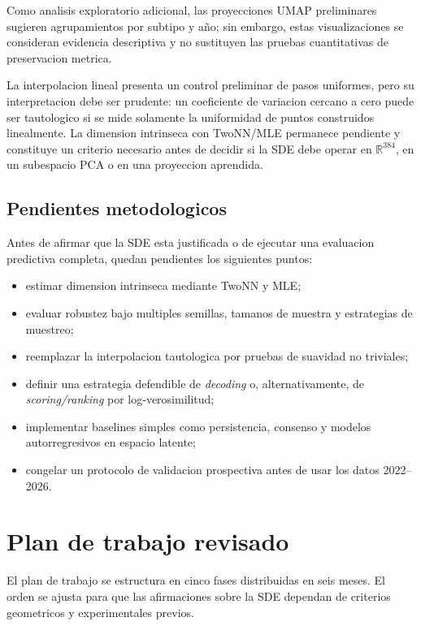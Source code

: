 \documentclass[12pt,letterpaper]{article}
\newcommand{\R}{\mathbb{R}}
\begin{document}
Como analisis exploratorio adicional, las proyecciones UMAP preliminares sugieren agrupamientos por subtipo y año; sin embargo, estas visualizaciones se consideran evidencia descriptiva y no sustituyen las pruebas cuantitativas de preservacion metrica.

La interpolacion lineal presenta un control preliminar de pasos uniformes, pero su interpretacion debe ser prudente: un coeficiente de variacion cercano a cero puede ser tautologico si se mide solamente la uniformidad de puntos construidos linealmente. La dimension intrinseca con TwoNN/MLE permanece pendiente y constituye un criterio necesario antes de decidir si la SDE debe operar en $\R^{384}$, en un subespacio PCA o en una proyeccion aprendida.

\subsection{Pendientes metodologicos}

Antes de afirmar que la SDE esta justificada o de ejecutar una evaluacion predictiva completa, quedan pendientes los siguientes puntos:

\begin{itemize}[leftmargin=2em]
    \item estimar dimension intrinseca mediante TwoNN y MLE;
    \item evaluar robustez bajo multiples semillas, tamanos de muestra y estrategias de muestreo;
    \item reemplazar la interpolacion tautologica por pruebas de suavidad no triviales;
    \item definir una estrategia defendible de \emph{decoding} o, alternativamente, de \emph{scoring/ranking} por log-verosimilitud;
    \item implementar baselines simples como persistencia, consenso y modelos autorregresivos en espacio latente;
    \item congelar un protocolo de validacion prospectiva antes de usar los datos 2022--2026.
\end{itemize}

\section{Plan de trabajo revisado}

El plan de trabajo se estructura en cinco fases distribuidas en seis meses. El orden se ajusta para que las afirmaciones sobre la SDE dependan de criterios geometricos y experimentales previos.
\end{document}
